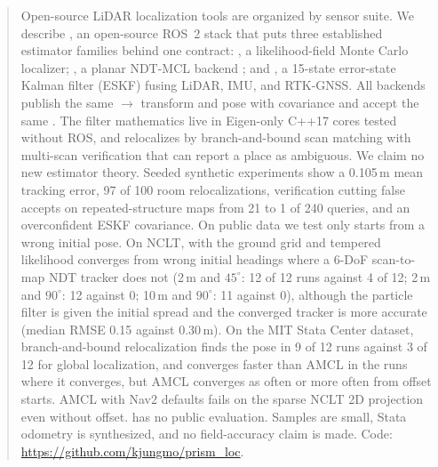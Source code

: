 \begin{abstract}
Open-source LiDAR localization tools are organized by sensor suite. We describe \emph{\sname}, an open-source ROS~2 stack that puts three established estimator families behind one contract: , a likelihood-field Monte Carlo localizer; , a planar NDT-MCL backend \citep{saarinen2013ndtmcl}; and , a 15-state error-state Kalman filter (ESKF) fusing LiDAR, IMU, and RTK-GNSS. All backends publish the same $\to$ transform and pose with covariance and accept the same . The filter mathematics live in Eigen-only C++17 cores tested without ROS, and  relocalizes by branch-and-bound scan matching with multi-scan verification that can report a place as ambiguous. We claim no new estimator theory. Seeded synthetic experiments show a 0.105\,m mean tracking error, 97 of 100 room relocalizations, verification cutting false accepts on repeated-structure maps from 21 to 1 of 240 queries, and an overconfident ESKF covariance. On public data we test only starts from a wrong initial pose. On NCLT,  with the ground grid and tempered likelihood converges from wrong initial headings where a 6-DoF scan-to-map NDT tracker does not (2\,m and $45^\circ$: 12 of 12 runs against 4 of 12; 2\,m and $90^\circ$: 12 against 0; 10\,m and $90^\circ$: 11 against 0), although the particle filter is given the initial spread and the converged tracker is more accurate (median RMSE 0.15 against 0.30\,m). On the MIT Stata Center dataset, branch-and-bound relocalization finds the pose in 9 of 12 runs against 3 of 12 for  global localization, and  converges faster than AMCL in the runs where it converges, but AMCL converges as often or more often from offset starts. AMCL with Nav2 defaults fails on the sparse NCLT 2D projection even without offset.  has no public evaluation. Samples are small, Stata odometry is synthesized, and no field-accuracy claim is made. Code: \url{https://github.com/kjungmo/prism_loc}.
\end{abstract}
